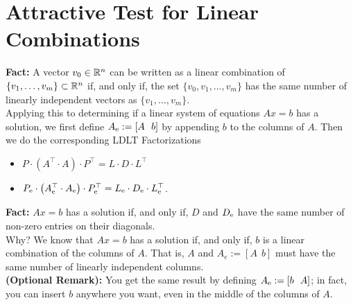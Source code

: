 \documentclass[letterpaper]{book}
\begin{document}
\section{Attractive Test for Linear Combinations}
\label{sec:AttractiveTestLinearCombination}

\begin{tcolorbox}[sharp corners, colback=green!30, colframe=green!80!blue,
title=\textbf{Pro Tip! Linear Combination or Not?}]
\textbf{Fact:} A vector $v_0\in \mathbb R^n$ can be written as a linear combination of $\{v_1, \ldots, v_m\} \subset \mathbb R^n$  if, and only if, the set $\{v_0, v_1, \ldots, v_m\}$ has the same number of linearly independent vectors as $\{v_1, \ldots, v_m\}$.\\

Applying this to determining if a linear system of equations $Ax=b$ has a solution, we first define $A_{\rm e} :=\left[A~~ b \right]$ by appending $b$ to the columns of $A$. Then we do the corresponding LDLT Factorizations
\begin{itemize}
    \item $P \cdot \left(A^\top \cdot A \right)\cdot P^\top = L \cdot D \cdot L^\top$
    \item $P_{\rm e} \cdot \left(A_{\rm e}^\top \cdot A_{\rm e}  \right) \cdot P^\top_{\rm e} = L_{\rm e} \cdot D_{\rm e} \cdot L^\top_{\rm e} $.
\end{itemize}

\textbf{Fact:}  $Ax=b$ has a solution if, and only if, $D$ and $D_{\rm e}$ have the same number of non-zero entries on their diagonals.\\

Why? We know that $Ax=b$ has a solution if, and only if, $b$ is a linear combination of the columns of $A$. That is, $A$ and $A_e:=[A~~b]$ must have the same number of linearly independent columns.\\

\textbf{(Optional Remark):} You get the same result by defining $A_{\rm e} :=\left[b~~ A \right]$; in fact, you can insert $b$ anywhere you want, even in the middle of the columns of $A$.
\end{tcolorbox}

\vspace*{.5cm}
\end{document}
